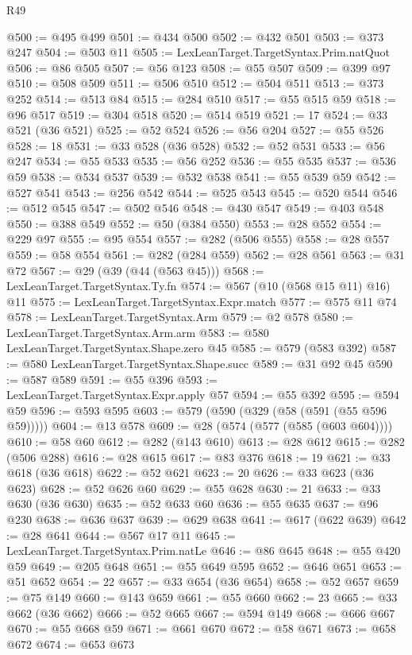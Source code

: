 \begin{lexlean}{R49}
\begin{coremodule}
@500 := @495 @499
@501 := @434 @500
@502 := @432 @501
@503 := @373 @247
@504 := @503 @11
@505 := LexLeanTarget.TargetSyntax.Prim.natQuot
@506 := @86 @505
@507 := @56 @123
@508 := @55 @507
@509 := @399 @97
@510 := @508 @509
@511 := @506 @510
@512 := @504 @511
@513 := @373 @252
@514 := @513 @84
@515 := @284 @510
@517 := @55 @515 @59
@518 := @96 @517
@519 := @304 @518
@520 := @514 @519
@521 := 17
@524 := @33 @521 (@36 @521)
@525 := @52 @524
@526 := @56 @204
@527 := @55 @526
@528 := 18
@531 := @33 @528 (@36 @528)
@532 := @52 @531
@533 := @56 @247
@534 := @55 @533
@535 := @56 @252
@536 := @55 @535
@537 := @536 @59
@538 := @534 @537
@539 := @532 @538
@541 := @55 @539 @59
@542 := @527 @541
@543 := @256 @542
@544 := @525 @543
@545 := @520 @544
@546 := @512 @545
@547 := @502 @546
@548 := @430 @547
@549 := @403 @548
@550 := @388 @549
@552 := @50 (@384 @550)
@553 := @28 @552
@554 := @229 @97
@555 := @95 @554
@557 := @282 (@506 @555)
@558 := @28 @557
@559 := @58 @554
@561 := @282 (@284 @559)
@562 := @28 @561
@563 := @31 @72
@567 := @29 (@39 (@44 (@563 @45)))
@568 := LexLeanTarget.TargetSyntax.Ty.fn
@574 := @567 (@10 (@568 @15 @11) @16) @11
@575 := LexLeanTarget.TargetSyntax.Expr.match
@577 := @575 @11 @74
@578 := LexLeanTarget.TargetSyntax.Arm
@579 := @2 @578
@580 := LexLeanTarget.TargetSyntax.Arm.arm
@583 := @580 LexLeanTarget.TargetSyntax.Shape.zero @45
@585 := @579 (@583 @392)
@587 := @580 LexLeanTarget.TargetSyntax.Shape.succ
@589 := @31 @92 @45
@590 := @587 @589
@591 := @55 @396
@593 := LexLeanTarget.TargetSyntax.Expr.apply @57
@594 := @55 @392
@595 := @594 @59
@596 := @593 @595
@603 := @579 (@590 (@329 (@58 (@591 (@55 @596 @59)))))
@604 := @13 @578
@609 := @28 (@574 (@577 (@585 (@603 @604))))
@610 := @58 @60
@612 := @282 (@143 @610)
@613 := @28 @612
@615 := @282 (@506 @288)
@616 := @28 @615
@617 := @83 @376
@618 := 19
@621 := @33 @618 (@36 @618)
@622 := @52 @621
@623 := 20
@626 := @33 @623 (@36 @623)
@628 := @52 @626 @60
@629 := @55 @628
@630 := 21
@633 := @33 @630 (@36 @630)
@635 := @52 @633 @60
@636 := @55 @635
@637 := @96 @230
@638 := @636 @637
@639 := @629 @638
@641 := @617 (@622 @639)
@642 := @28 @641
@644 := @567 @17 @11
@645 := LexLeanTarget.TargetSyntax.Prim.natLe
@646 := @86 @645
@648 := @55 @420 @59
@649 := @205 @648
@651 := @55 @649 @595
@652 := @646 @651
@653 := @51 @652
@654 := 22
@657 := @33 @654 (@36 @654)
@658 := @52 @657
@659 := @75 @149
@660 := @143 @659
@661 := @55 @660
@662 := 23
@665 := @33 @662 (@36 @662)
@666 := @52 @665
@667 := @594 @149
@668 := @666 @667
@670 := @55 @668 @59
@671 := @661 @670
@672 := @58 @671
@673 := @658 @672
@674 := @653 @673

\end{coremodule}
\end{lexlean}
